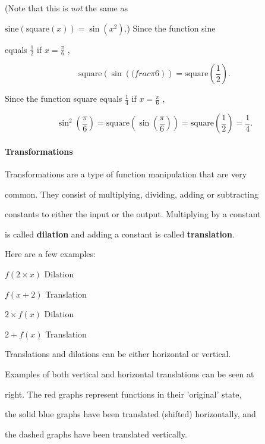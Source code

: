 (Note that this is \textit{not} the same as

$\text{sine}(\text{square}(x))=\sin(x^2)$.) Since the function sine

equals $\tfrac{1}{2}$ if $x=\frac{\pi}{6}$ ,



$$\text{square}\left(\sin\left((frac{\pi}{6}\right)\right)=\text{square}\left(\frac{1}{2}\right).$$



Since the function square equals $\frac{1}{4}$ if $x=\frac{\pi}{6}$ ,



$$\sin^2\left(\frac{\pi}{6}\right)=\text{square}\left(\sin\left(\frac{\pi}{6}\right)\right)=\text{square}\left(\frac{1}{2}\right)=\frac{1}{4}.$$



\paragraph{Transformations}



Transformations are a type of function manipulation that are very

common. They consist of multiplying, dividing, adding or subtracting

constants to either the input or the output. Multiplying by a constant

is called \textbf{dilation} and adding a constant is called \textbf{translation}.

Here are a few examples:



$f(2\times x)$ Dilation



$f(x+2)$ Translation



$2\times f(x)$ Dilation



$2+f(x)$ Translation



Translations and dilations can be either horizontal or vertical.

Examples of both vertical and horizontal translations can be seen at

right. The red graphs represent functions in their 'original' state,

the solid blue graphs have been translated (shifted) horizontally, and

the dashed graphs have been translated vertically.



